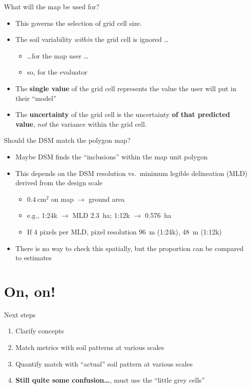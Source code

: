 \documentclass[aspectratio=169, 10pt]{beamer}
\begin{document}
\begin{frame}{What will the map be used for?}
    \begin{itemize}
        \item This governs the selection of grid cell size.
        \item The soil variability \emph{within} the grid cell is ignored \ldots
        \begin{itemize}
            \item \ldots for the map user \ldots
            \item so, for the evaluator
        \end{itemize}
        \item The \textbf{single value} of the grid cell represents the value the user will put in their ``model''
        \item The \textbf{uncertainty} of the grid cell is the uncertainty \textbf{of that predicted value}, \emph{not} the variance within the grid cell.
    \end{itemize}
\end{frame}

\begin{frame}{Should the DSM match the polygon map?}
    \begin{itemize}
        \item Maybe DSM finds the ``inclusions'' within the map unit polygon
        \item This depends on the DSM resolution vs.\ minimum legible delineation (MLD) derived from the design scale
        \begin{itemize}
            \item $0.4~\mathrm{cm}^2$ on map $\to$ ground area
            \item e.g., 1:24k $\to$ MLD 2.3~ha; 1:12k $\to$ 0.576~ha
            \item If 4 pixels per MLD, pixel resolution 96~m (1:24k), 48~m (1:12k)
        \end{itemize}
        \item There is no way to check this spatially, but the proportion can be compared to estimates
    \end{itemize}
  \end{frame}
  
\section{On, on!}

\begin{frame}{Next steps}
\begin{enumerate}
    \item Clarify concepts
    \item Match metrics with soil patterns at various scales
    \item Quantify match with ``actual'' soil pattern at various scales
    \item \textbf{Still quite some confusion\ldots}, must use the ``little grey cells''
\end{enumerate}
\end{frame}
\end{document}
